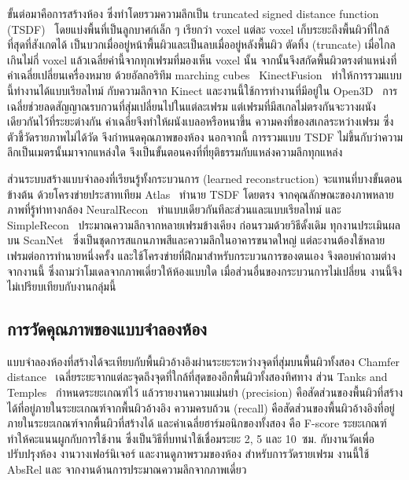 ขั้นต่อมาคือการสร้างห้อง ซึ่งทำโดยรวมความลึกเป็น truncated signed distance function (TSDF)~\cite{curless96}
โดยแบ่งพื้นที่เป็นลูกบาศก์เล็ก ๆ เรียกว่า voxel แต่ละ voxel เก็บระยะถึงพื้นผิวที่ใกล้ที่สุดที่สังเกตได้
เป็นบวกเมื่ออยู่หน้าพื้นผิวและเป็นลบเมื่ออยู่หลังพื้นผิว ตัดทิ้ง (truncate) เมื่อไกลเกินไม่กี่ voxel
แล้วเฉลี่ยค่านี้จากทุกเฟรมที่มองเห็น voxel นั้น จากนั้นจึงสกัดพื้นผิวตรงตำแหน่งที่ค่าเฉลี่ยเปลี่ยนเครื่องหมาย
ด้วยอัลกอริทึม marching cubes~\cite{marchingcubes} KinectFusion~\cite{kinectfusion} ทำให้การรวมแบบนี้ทำงานได้แบบเรียลไทม์
กับความลึกจาก Kinect และงานนี้ใช้การทำงานที่มีอยู่ใน Open3D~\cite{open3d}
การเฉลี่ยช่วยลดสัญญาณรบกวนที่สุ่มเปลี่ยนไปในแต่ละเฟรม แต่เฟรมที่มีสเกลไม่ตรงกันจะวางผนังเดียวกันไว้ที่ระยะต่างกัน
ค่าเฉลี่ยจึงทำให้ผนังเบลอหรือหนาขึ้น ความคงที่ของสเกลระหว่างเฟรม ซึ่งตัวชี้วัดรายภาพไม่ได้วัด จึงกำหนดคุณภาพของห้อง
นอกจากนี้ การรวมแบบ TSDF ไม่ขึ้นกับว่าความลึกเป็นเมตรนั้นมาจากแหล่งใด
จึงเป็นขั้นตอนคงที่ที่ยุติธรรมกับแหล่งความลึกทุกแหล่ง

ส่วนระบบสร้างแบบจำลองที่เรียนรู้ทั้งกระบวนการ (learned reconstruction) จะแทนที่บางขั้นตอนข้างต้น
ด้วยโครงข่ายประสาทเทียม Atlas~\cite{atlas} ทำนาย TSDF โดยตรง จากคุณลักษณะของภาพหลายภาพที่รู้ท่าทางกล้อง
NeuralRecon~\cite{neuralrecon}
ทำแบบเดียวกันทีละส่วนและแบบเรียลไทม์ และ SimpleRecon~\cite{simplerecon} ประมาณความลึกจากหลายเฟรมข้างเคียง
ก่อนรวมด้วยวิธีดั้งเดิม ทุกงานประเมินผลบน ScanNet~\cite{scannet} ซึ่งเป็นชุดการสแกนภาพสีและความลึกในอาคารขนาดใหญ่
แต่ละงานต้องใช้หลายเฟรมต่อการทำนายหนึ่งครั้ง และใช้โครงข่ายที่ฝึกมาสำหรับกระบวนการของตนเอง
จึงตอบคำถามต่างจากงานนี้ ซึ่งถามว่าโมเดลจากภาพเดี่ยวให้ห้องแบบใด เมื่อส่วนอื่นของกระบวนการไม่เปลี่ยน
งานนี้จึงไม่เปรียบเทียบกับงานกลุ่มนี้

\subsection{การวัดคุณภาพของแบบจำลองห้อง}
แบบจำลองห้องที่สร้างได้จะเทียบกับพื้นผิวอ้างอิงผ่านระยะระหว่างจุดที่สุ่มบนพื้นผิวทั้งสอง
Chamfer distance~\cite{chamfer} เฉลี่ยระยะจากแต่ละจุดถึงจุดที่ใกล้ที่สุดของอีกพื้นผิวทั้งสองทิศทาง
ส่วน Tanks and Temples~\cite{tanks} กำหนดระยะเกณฑ์ไว้ แล้วรายงานความแม่นยำ (precision)
คือสัดส่วนของพื้นผิวที่สร้างได้ที่อยู่ภายในระยะเกณฑ์จากพื้นผิวอ้างอิง ความครบถ้วน (recall)
คือสัดส่วนของพื้นผิวอ้างอิงที่อยู่ภายในระยะเกณฑ์จากพื้นผิวที่สร้างได้ และค่าเฉลี่ยฮาร์มอนิกของทั้งสอง คือ F-score
ระยะเกณฑ์ทำให้คะแนนผูกกับการใช้งาน ซึ่งเป็นวิธีที่บทนำใช้เชื่อมระยะ 2, 5 และ 10~ซม.
กับงานวัดเพื่อปรับปรุงห้อง งานวางเฟอร์นิเจอร์ และงานดูภาพรวมของห้อง สำหรับการวัดรายเฟรม
งานนี้ใช้ AbsRel และ \wone{} จากงานด้านการประมาณความลึกจากภาพเดี่ยว~\cite{eigen14}

